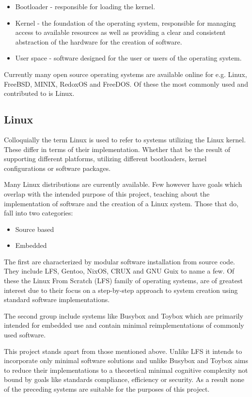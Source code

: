 \begin{itemize}
    \item Bootloader - responsible for loading the kernel.
    \item Kernel - the foundation of the operating system, responsible for managing access to available resources as well as providing a clear and consistent abstraction of the hardware for the creation of software.
    \item User space - software designed for the user or users of the operating system.
\end{itemize}

Currently many open source operating systems are available online for e.g. Linux, FreeBSD, MINIX, RedoxOS and FreeDOS. Of these the most commonly used and contributed to is Linux.

\subsection{Linux}

Colloquially the term Linux is used to refer to systems utilizing the Linux kernel. These differ in terms of their implementation. Whether that be the result of supporting different platforms, utilizing different bootloaders, kernel configurations or software packages.

Many Linux distributions are currently available. Few however have goals which overlap with the intended purpose of this project, teaching about the implementation of software and the creation of a Linux system. Those that do, fall into two categories:

\begin{itemize}
    \item Source based
    \item Embedded
\end{itemize}

The first are characterized by modular software installation from source code. They include LFS, Gentoo, NixOS, CRUX and GNU Guix to name a few. Of these the Linux From Scratch (LFS) family of operating systems, are of greatest interest due to their focus on a step-by-step approach to system creation using standard software implementations. 

The second group include systems like Busybox and Toybox which are primarily intended for embedded use and contain minimal reimplementations of commonly used software.

This project stands apart from those mentioned above. Unlike LFS it intends to incorporate only minimal software solutions and unlike Busybox and Toybox aims to reduce their implementations to a theoretical minimal cognitive complexity not bound by goals like standards compliance, efficiency or security. As a result none of the preceding systems are suitable for the purposes of this project.
